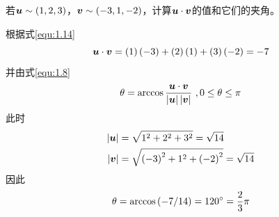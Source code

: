 \begin{example}
若$\boldsymbol{u}\sim \left( 1,2,3 \right) $，$\boldsymbol{v}\sim \left( -3,1,-2 \right) $，计算$\boldsymbol{u}\cdot \boldsymbol{v}$的值和它们的夹角。
\end{example}
\begin{solution}
根据式\eqref{equ:1.14}
\begin{equation*}
	\boldsymbol{u}\cdot \boldsymbol{v}=\left( 1 \right) \left( -3 \right) +\left( 2 \right) \left( 1 \right) +\left( 3 \right) \left( -2 \right) =-7
\end{equation*}
并由式\eqref{equ:1.8}
\begin{equation*}
	\theta =\arccos \frac{\boldsymbol{u}\cdot \boldsymbol{v}}{\left| \boldsymbol{u} \right|\left| \boldsymbol{v} \right|}\,\, ,  0\le \theta \le \pi 
\end{equation*}
此时
\begin{align*}
	\left| \boldsymbol{u} \right|&=\sqrt{1^2+2^2+3^2}=\sqrt{14}\\
	\left| \boldsymbol{v} \right|&=\sqrt{\left( -3 \right) ^2+1^2+\left( -2 \right) ^2}=\sqrt{14}
\end{align*}
因此
\begin{equation*}
	\theta =\arccos \left( -7/14 \right) =120^{\circ}=\frac{2}{3}\pi 
\end{equation*}
\end{solution}